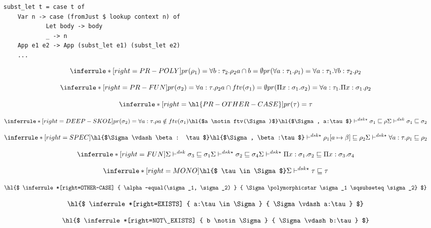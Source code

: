 \begin{lstlisting}
subst_let t = case t of
    Var n -> case (fromJust $ lookup context n) of
            Let body -> body
            _ -> n
    App e1 e2 -> App (subst_let e1) (subst_let e2)
    ...
\end{lstlisting}


\[
\inferrule*[right=PR-POLY]
{pr(\rho_1) = \forall b:\tau_2. \rho_2 \\ a \cap b = \emptyset} {pr(\forall a:\tau_1. \rho_1) = \forall a:\tau_1. \forall b:\tau_2. \rho_2}
\]

\[
\inferrule*[right=PR-FUN]
{pr(\sigma_2) = \forall a:\tau. \rho_2 \\ a \cap ftv(\sigma_1) = \emptyset} {pr(\Pi x:\sigma_1. \sigma_2) = \forall a:\tau_1. \Pi x:\sigma_1. \rho_2}
\]

\[
\inferrule*[right=\hl{PR-OTHER-CASE}]
{  } {pr(\tau)=\tau}
\]


\[
\inferrule*[right=DEEP-SKOL]
{pr(\sigma_2)=\forall a:\tau. \rho \\ a \notin ftv(\sigma_1) \\
\hl{$a \notin ftv(\Sigma)$} \\
\hl{$\Sigma, a:\tau$} \polymorphicstar \sigma_1 \sqsubseteq \rho }
{\Sigma \polymorphic \sigma_1 \sqsubseteq \sigma_2}
\]


\[
\inferrule*[right=SPEC]
{\hl{$\Sigma \vdash \beta: \tau$} \\
\hl{$\Sigma, \beta:\tau$} \polymorphicstar \rho_1[a \mapsto \beta] \sqsubseteq \rho_2}
{\Sigma \polymorphicstar \forall a:\tau.\rho_1 \sqsubseteq \rho_2}
\]

\[
\inferrule*[right=FUN]
{\Sigma \polymorphic  \sigma_3 \sqsubseteq \sigma_1 \\
\Sigma \polymorphicstar  \sigma_2 \sqsubseteq \sigma_4}
{\Sigma \polymorphicstar \Pi x:\sigma_1. \sigma_2 \sqsubseteq \Pi x:\sigma_3. \sigma_4}
\]

\[
\inferrule*[right=MONO]
{\hl{$ \tau \in \Sigma$}}
{\Sigma \polymorphicstar \tau \sqsubseteq \tau}
\]

\[
\hl{$
\inferrule*[right=OTHER-CASE]
{  \alpha-equal(\sigma_1, \sigma_2)  }
{ \Sigma \polymorphicstar \sigma_1 \sqsubseteq \sigma_2}
$}
\]


\[
\hl{$
\inferrule*[right=EXISTS]
{ a:\tau \in \Sigma}
{ \Sigma \vdash a:\tau}
$}
\]

\[
\hl{$
\inferrule*[right=NOT\_EXISTS]
{ b \notin \Sigma}
{ \Sigma \vdash b:\tau}
$}
\]

